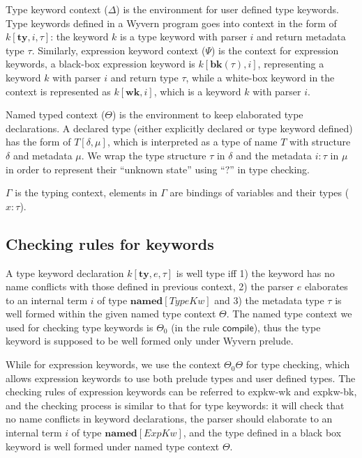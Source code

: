 \documentclass{sig-alternate}
\begin{document}
Type keyword context ($\Delta$) is the environment for user defined type keywords. Type keywords defined in a Wyvern program goes into context in the form of $k[\mathbf{ty},i,\tau]$: the keyword $k$ is a type keyword with parser $i$ and return metadata type $\tau$. Similarly, expression keyword context ($\Psi$) is the context for expression keywords, a black-box expression keyword is $k[\mathbf{bk}(\tau),i]$, representing a keyword $k$ with parser $i$ and return type $\tau$, while a white-box keyword in the context is represented as $k[\mathbf{wk},i]$, which is a keyword $k$ with parser $i$.

Named typed context ($\Theta$) is the environment to keep elaborated type declarations. A declared type (either explicitly declared or type keyword defined) has the form of $T[\delta,\mu]$, which is interpreted as a type of name $T$ with structure $\delta$ and metadata $\mu$. We wrap the type structure $\tau$ in $\delta$ and the metadata $i:\tau$ in $\mu$ in order to represent their ``unknown state'' using ``$?$'' in type checking.

$\Gamma$ is the typing context, elements in $\Gamma$ are bindings of variables and their types ($x:\tau$).

\subsection{Checking rules for keywords}
A type keyword declaration $k[\mathbf{ty},e,\tau]$ is well type iff 1) the keyword has no name conflicts with those defined in previous context, 2) the parser $e$ elaborates to an internal term $i$ of type $\mathbf{named}[TypeKw]$ and 3) the metadata type $\tau$ is well formed within the given named type context $\Theta$. The named type context we used for checking type keywords is $\Theta_0$ (in the rule $\mathsf{compile}$), thus the type keyword is supposed to be well formed only under Wyvern prelude.

While for expression keywords, we use the context $\Theta_0\Theta$ for type checking, which allows expression keywords to use both prelude types and user defined types. The checking rules of expression keywords can be referred to expkw-wk and expkw-bk, and the checking process is similar to that for type keywords: it will check that no name conflicts in keyword declarations, the parser should elaborate to an internal term $i$ of type $\mathbf{named}[ExpKw]$, and the type defined in a black box keyword is well formed under named type context $\Theta$.
\end{document}
